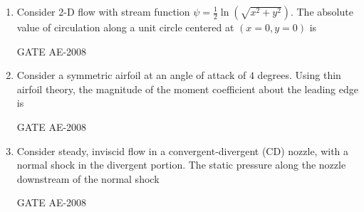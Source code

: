 \documentclass[journal,12pt,onecolumn]{IEEEtran}
\theoremstyle{remark}
\begin{document}
\begin{enumerate}
    \quad

\item Consider 2-D flow with stream function $\psi = \frac{1}{2} \ln\left( \sqrt{x^2 + y^2} \right)$. The absolute value of circulation along a unit circle centered at $(x=0, y=0)$ is  \\
\begin{enumerate}
\end{enumerate}
    \hfill{GATE AE-2008}

    \quad

\item Consider a symmetric airfoil at an angle of attack of $4$ degrees. Using thin airfoil theory, the magnitude of the moment coefficient about the leading edge is  \\
\begin{enumerate}
\end{enumerate}
    \hfill{GATE AE-2008}

    \quad

\item Consider steady, inviscid flow in a convergent-divergent (CD) nozzle, with a normal shock in the divergent portion. The static pressure along the nozzle downstream of the normal shock  \\
\begin{enumerate}
\end{enumerate}
    \hfill{GATE AE-2008}


\end{enumerate}
\end{document}
